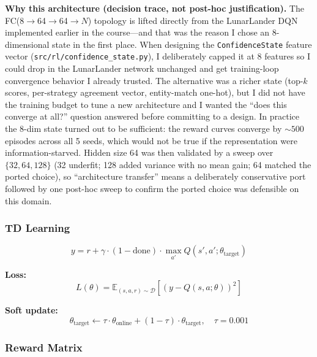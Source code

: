 \documentclass[11pt,letterpaper]{article}
\begin{document}
\textbf{Why this architecture (decision trace, not post-hoc justification).} The FC(8$\to$64$\to$64$\to$$N$) topology is lifted directly from the LunarLander DQN implemented earlier in the course---and that was the reason I chose an 8-dimensional state in the first place. When designing the \texttt{ConfidenceState} feature vector (\texttt{src/rl/confidence\_state.py}), I deliberately capped it at 8 features so I could drop in the LunarLander network unchanged and get training-loop convergence behavior I already trusted. The alternative was a richer state (top-$k$ scores, per-strategy agreement vector, entity-match one-hot), but I did not have the training budget to tune a new architecture and I wanted the ``does this converge at all?'' question answered before committing to a design. In practice the 8-dim state turned out to be sufficient: the reward curves converge by ${\sim}500$ episodes across all 5 seeds, which would not be true if the representation were information-starved. Hidden size 64 was then validated by a sweep over $\{32, 64, 128\}$ (32 underfit; 128 added variance with no mean gain; 64 matched the ported choice), so ``architecture transfer'' means a deliberately conservative port followed by one post-hoc sweep to confirm the ported choice was defensible on this domain.

\subsubsection{TD Learning}

\begin{equation}
  y = r + \gamma \cdot (1 - \text{done}) \cdot \max_{a'} Q(s', a'; \theta_{\text{target}})
\end{equation}

\textbf{Loss:}
\begin{equation}
  L(\theta) = \mathbb{E}_{(s,a,r) \sim \mathcal{D}} \left[ (y - Q(s, a; \theta))^2 \right]
\end{equation}

\textbf{Soft update:}
\begin{equation}
  \theta_{\text{target}} \leftarrow \tau \cdot \theta_{\text{online}} + (1 - \tau) \cdot \theta_{\text{target}}, \quad \tau = 0.001
\end{equation}

\subsubsection{Reward Matrix}
\end{document}
